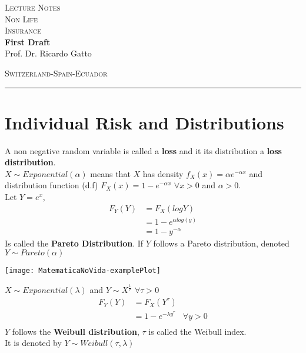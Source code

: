 \documentclass[11pt,a4paper,oneside]{article}
\newcommand*{\titleBOOK}{\begingroup
\centering
\vspace*{\baselineskip}
\vspace*{\baselineskip}
{\Huge\scshape Lecture Notes}\\[10mm]
{\Huge\scshape Non Life  \\[5mm]
Insurance} \\ [\baselineskip]
{\Large\bfseries First Draft}\\[0.3 \textheight]
{\Large Prof. Dr. Ricardo Gatto}\\
\vfill
\begin{center}
{\scshape Switzerland-Spain-Ecuador}\\
\rule{\textwidth}{0.5pt}
\end{center}
\vspace*{\baselineskip}
\endgroup}
\begin{document}

\titleBOOK
\newpage

\tableofcontents
\newpage


\section{Individual Risk and Distributions}
A non negative random variable is called a \textbf{loss} and it its distribution a \textbf{loss distribution}.\\
$X\sim Exponential(\alpha)$ means that $X$ has density $f_X(x)=\alpha e^{-\alpha x}$ and distribution function (d.f) $F_X(x)=1-e^{-\alpha x}$ $\forall x>0$ and $\alpha>0$.\\


Let $Y=e^x$, 
\begin{align*}
F_Y(Y) &= F_X(log Y)\\
&=1-e^{\alpha log (y)}\\
&=1-y^{-\alpha}
\end{align*}
Is called the \textbf{Pareto Distribution}. If $Y$ follows a Pareto distribution, denoted  $Y\sim Pareto(\alpha)$

\texttt{[image: MatematicaNoVida-examplePlot]}

$X\sim Exponential (\lambda)$ and $Y\sim X^{\frac{1}{\tau}}$ $\forall \tau>0$
\begin{align*}
F_Y(Y) &= F_X(Y^{\tau})\\
&=1-e^{-\lambda y^{\tau}} \ \ \ \ \forall y>0\\
\end{align*}
$Y$ follows the \textbf{Weibull distribution}, $\tau$ is called the Weibull index.\\ It is denoted by $Y\sim Weibull(\tau,\lambda)$
\end{document}

